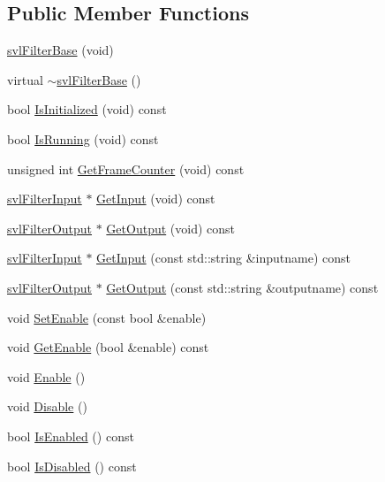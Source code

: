 \subsection*{Public Member Functions}
\begin{DoxyCompactItemize}
\item 
\hyperlink{classsvl_filter_base_a269f783a5c7874b322c9bbd722817b06}{svl\-Filter\-Base} (void)
\item 
virtual \hyperlink{classsvl_filter_base_a7da68763be0344ab0f76e95be8929522}{$\sim$svl\-Filter\-Base} ()
\item 
bool \hyperlink{classsvl_filter_base_adfb3934882187f7d93cca9a53de1a5d2}{Is\-Initialized} (void) const 
\item 
bool \hyperlink{classsvl_filter_base_a106aa0279f50120dcc4c1341bad9b215}{Is\-Running} (void) const 
\item 
unsigned int \hyperlink{classsvl_filter_base_ac8735aa0dc6ac4cd4793f3f5e8a59fd3}{Get\-Frame\-Counter} (void) const 
\item 
\hyperlink{classsvl_filter_input}{svl\-Filter\-Input} $\ast$ \hyperlink{classsvl_filter_base_a213614f22bd7eb9e857047fe23a1b32c}{Get\-Input} (void) const 
\item 
\hyperlink{classsvl_filter_output}{svl\-Filter\-Output} $\ast$ \hyperlink{classsvl_filter_base_adecb846c22f5b733bc390174d4c60604}{Get\-Output} (void) const 
\item 
\hyperlink{classsvl_filter_input}{svl\-Filter\-Input} $\ast$ \hyperlink{classsvl_filter_base_a6504cd87f70537b7d138b773b0f4f2d6}{Get\-Input} (const std\-::string \&inputname) const 
\item 
\hyperlink{classsvl_filter_output}{svl\-Filter\-Output} $\ast$ \hyperlink{classsvl_filter_base_a04754b11d6f30570a11f4d7ef952dbb1}{Get\-Output} (const std\-::string \&outputname) const 
\item 
void \hyperlink{classsvl_filter_base_ae36e9ffa816cbba99408a192b0a40404}{Set\-Enable} (const bool \&enable)
\item 
void \hyperlink{classsvl_filter_base_a91b7098508d20e1a1f47dc6c8daaccaf}{Get\-Enable} (bool \&enable) const 
\item 
void \hyperlink{classsvl_filter_base_aede0eda157c10226a3bbe515c7e0f24e}{Enable} ()
\item 
void \hyperlink{classsvl_filter_base_aec8b5a897df5b716e8160e456e798d5f}{Disable} ()
\item 
bool \hyperlink{classsvl_filter_base_acb531ee3a839026b521f49408412f6d7}{Is\-Enabled} () const 
\item 
bool \hyperlink{classsvl_filter_base_ac16dab2dc8ff2b9850800a87338a940f}{Is\-Disabled} () const 
\end{DoxyCompactItemize}
